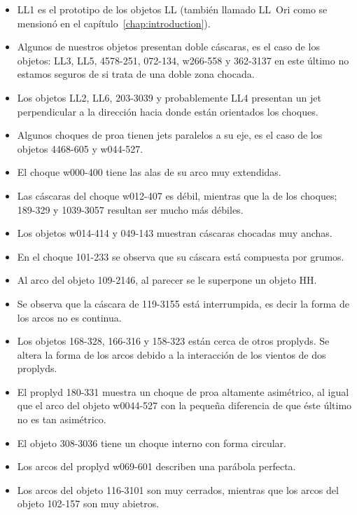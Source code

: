 \begin{itemize}
\item LL1 es el prototipo de los objetos LL  (también llamado LL~Ori como se mensionó en el capítulo~\ref{chap:introduction}).
\item Algunos de nuestros objetos presentan doble cáscaras, es el caso de los objetos: LL3, LL5, 4578-251, 072-134, w266-558 y 362-3137 en este último no estamos seguros de si trata de una doble zona chocada.  
\item Los objetos LL2, LL6, 203-3039 y probablemente LL4 presentan un jet perpendicular a la dirección hacia donde están orientados los choques.
\item Algunos choques de proa tienen jets paralelos a su eje, es el caso de los objetos 4468-605 y w044-527.
\item El choque w000-400 tiene las alas de su arco muy extendidas.
\item Las cáscaras del choque w012-407 es débil, mientras que la de los choques; 189-329 y 1039-3057 resultan ser mucho más débiles.
\item Los objetos w014-414 y 049-143 muestran cáscaras chocadas muy anchas.
\item En el choque 101-233 se observa que su cáscara está compuesta por grumos.
\item Al arco del objeto 109-2146, al parecer se le superpone un objeto HH.
\item Se observa que la cáscara de 119-3155 está interrumpida, es decir la forma de los arcos no es continua.
\item Los objetos 168-328, 166-316 y 158-323 están cerca de otros proplyds. Se altera la forma de los arcos debido a la interacción de los vientos de dos proplyds.  
\item El proplyd 180-331 muestra un choque de proa altamente asimétrico, al igual que el arco del objeto w0044-527 con la pequeña  diferencia de que éste último no es tan asimétrico.
\item El objeto 308-3036 tiene un choque interno con forma circular.
\item Los arcos del proplyd w069-601 describen una parábola perfecta.
\item Los arcos del objeto 116-3101 son muy cerrados, mientras que los arcos del objeto 102-157 son muy abietros.

\end{itemize}


